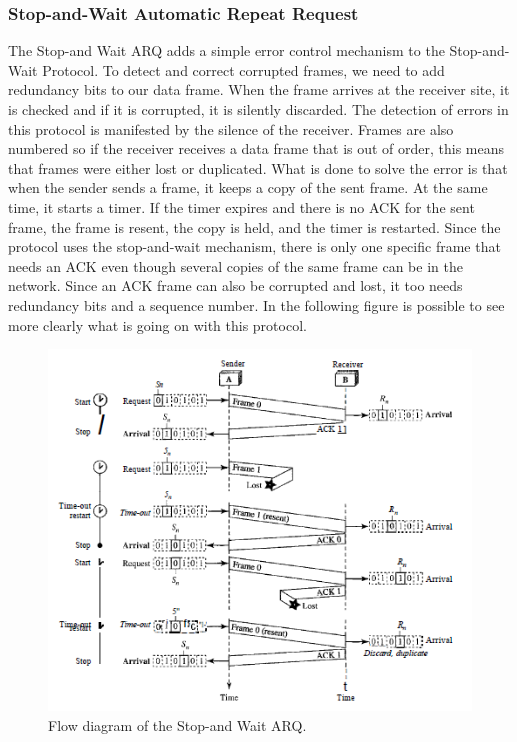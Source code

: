 \subsubsection{Stop-and-Wait Automatic Repeat Request}
The Stop-and Wait ARQ adds a simple error control mechanism to the Stop-and-Wait Protocol. To detect and correct corrupted frames, we need to add redundancy bits to our data frame. When the frame arrives at the receiver site, it is checked and if it is corrupted, it is silently discarded. The detection of errors in this protocol is manifested by the silence of the receiver. Frames are also numbered so if the receiver receives a data frame that is out of order, this means that frames were either lost or duplicated. What is done to solve the error is that when the sender sends a frame, it    keeps a copy of the sent frame. At the same time, it starts a timer. If the timer expires and there is no ACK for the sent frame, the frame is resent, the copy is held, and the timer is restarted. Since the protocol uses the stop-and-wait mechanism, there is only one specific frame that needs an ACK even though several copies of the same frame can be in the network. Since an ACK frame can also be corrupted and lost, it too needs redundancy bits and a sequence number. In the following figure is possible to see more clearly what is going on with this protocol. 

\begin{figure}[H]
\begin{center}
\includegraphics[scale=1]{flowdiagram.PNG} 
\caption{Flow diagram of the Stop-and Wait ARQ.}
\end{center}
\end{figure}

